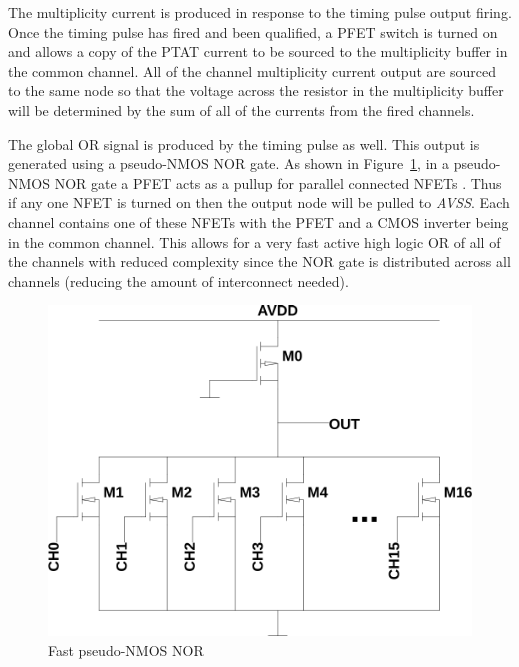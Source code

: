 \documentclass[12pt,oneside,final]{siuethesis}
\theoremstyle{definition}
\begin{document}
\par The multiplicity current is produced in response to the timing pulse output firing. Once the timing pulse has fired and been qualified, a PFET switch is turned on and allows a copy of the PTAT current to be sourced to the multiplicity buffer in the common channel. All of the channel multiplicity current output are sourced to the same node so that the voltage across the resistor in the multiplicity buffer will be determined by the sum of all of the currents from the fired channels. 

\par The global OR signal is produced by the timing pulse as well. This output is generated using a pseudo-NMOS NOR gate. As shown in Figure~\ref{fig:pseudo-nmos}, in a pseudo-NMOS NOR gate a PFET acts as a pullup for parallel connected NFETs \cite{WESTE}. Thus if any one NFET is turned on then the output node will be pulled to \emph{AVSS}. Each channel contains one of these NFETs with the PFET and a CMOS inverter being in the common channel. This allows for a very fast active high logic OR of all of the channels with reduced complexity since the NOR gate is distributed across all channels (reducing the amount of interconnect needed).

\begin{figure}[htbp!]
 \centering
 \includegraphics[scale=.45,keepaspectratio=true]{../LTspice_Drawings/pseudo-nmos/pseudo-nmos.png}
 \caption{Fast pseudo-NMOS NOR}
 \label{fig:pseudo-nmos}
\end{figure}
\end{document}
